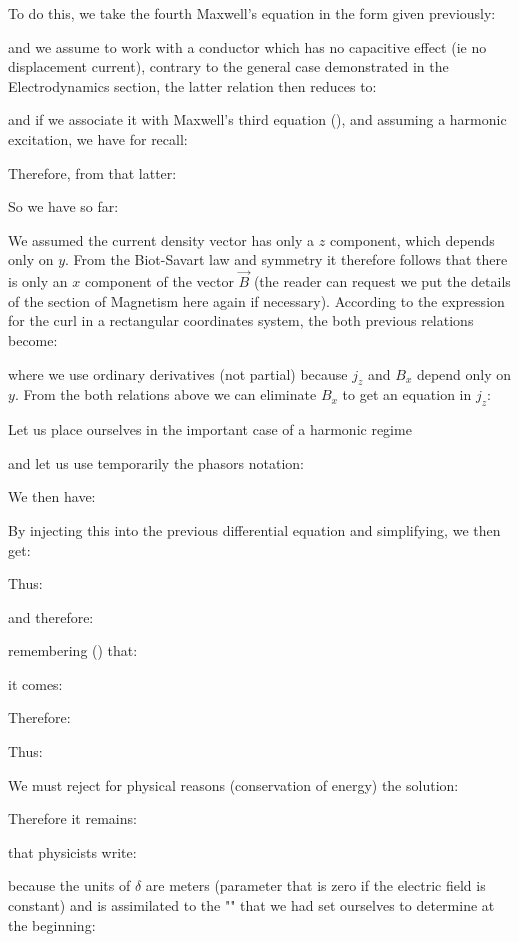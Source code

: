 	To do this, we take the fourth Maxwell's equation in the form given previously:
	
	and we assume to work with a conductor which has no capacitive effect (ie no displacement current), contrary to the general case demonstrated in the Electrodynamics section, the latter relation then reduces to:
	
	and if we associate it with Maxwell's third equation (), and assuming a harmonic excitation, we have for recall:
	
	Therefore, from that latter:
	
	So we have so far:	
	
	We assumed the current density vector has only a $z$ component, which depends only on $y$. From the Biot-Savart law and symmetry it therefore follows that there is only an $x$ component of the vector $\vec{B}$ (the reader can request we put the details of the section of Magnetism here again if necessary). According to the expression for the curl in a rectangular coordinates system, the both previous relations become:
	
	where we use ordinary derivatives (not partial) because $j_z$ and $B_x$ depend only on $y$.
	From the both relations above we can eliminate $B_x$ to get an equation in $j_z$:
	
	Let us place ourselves in the important case of a harmonic regime
	
	and let us use temporarily the phasors notation:
	
	We then have:
	
	By injecting this into the previous differential equation and simplifying, we then get:
	
	Thus:
	
	and therefore:
	
	remembering () that:
	
	it comes:
	
	Therefore:
	
	Thus:
	
	We must reject for physical reasons (conservation of energy) the solution:
	
	Therefore it remains:
	
	that physicists write:
	
	because the units of $\delta$ are meters (parameter that is zero if the electric field is constant) and is assimilated to the "" that we had set ourselves to determine at the beginning:
	

